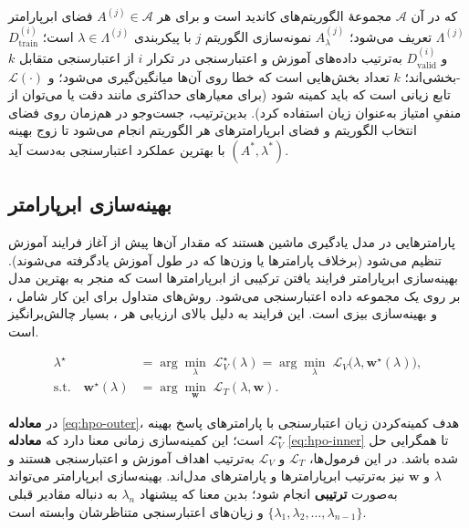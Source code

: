 که در آن \(\mathcal{A}\) مجموعهٔ الگوریتم‌های کاندید است و برای هر \(A^{(j)} \in \mathcal{A}\) فضای ابرپارامتر \(\Lambda^{(j)}\) تعریف می‌شود؛ \(A^{(j)}_{\lambda}\) نمونه‌سازی الگوریتم \(j\) با پیکربندی \(\lambda \in \Lambda^{(j)}\) است؛ \(D^{(i)}_{\mathrm{train}}\) و \(D^{(i)}_{\mathrm{valid}}\) به‌ترتیب داده‌های آموزش و اعتبارسنجی در تکرار \(i\) از اعتبارسنجی متقابل \(k\)-بخشی‌اند؛ \(k\) تعداد بخش‌هایی است که خطا روی آن‌ها میانگین‌گیری می‌شود؛ و \(\mathcal{L}(\cdot)\) تابع زیانی است که باید کمینه شود (برای معیارهای حداکثری مانند دقت یا  می‌توان از منفیِ امتیاز به‌عنوان زیان استفاده کرد). بدین‌ترتیب، جست‌وجو در  هم‌زمان روی فضای انتخاب الگوریتم و فضای ابرپارامترهای هر الگوریتم انجام می‌شود تا زوج بهینه \((A^{*}, \lambda^{*})\) با بهترین عملکرد اعتبارسنجی به‌دست آید.
\subsection{بهینه‌سازی ابرپارامتر}
 پارامترهایی در مدل یادگیری ماشین هستند که مقدار آن‌ها پیش از آغاز فرایند آموزش تنظیم می‌شود (برخلاف پارامترها یا وزن‌ها که در طول آموزش یادگرفته می‌شوند). بهینه‌سازی ابرپارامتر فرایند یافتن ترکیبی از ابرپارامترها است که منجر به بهترین  مدل بر روی یک مجموعه داده اعتبارسنجی می‌شود. روش‌های متداول برای این کار شامل ،  و بهینه‌سازی بیزی است. این فرایند به دلیل  بالای ارزیابی هر ، بسیار چالش‌برانگیز است.

\begin{align}
    \lambda^\star                              & = \arg\min_{\lambda}\; \mathcal{L}_V^\star(\lambda)
    = \arg\min_{\lambda}\; \mathcal{L}_V\!\big(\lambda, \mathbf{w}^\star(\lambda)\big) \label{eq:hpo-outer},                        \\
    \text{s.t.}\quad \mathbf{w}^\star(\lambda) & = \arg\min_{\mathbf{w}}\; \mathcal{L}_T(\lambda, \mathbf{w}) \label{eq:hpo-inner}.
\end{align}

در \textbf{معادله} \eqref{eq:hpo-outer}، هدف کمینه‌کردن زیان اعتبارسنجی با پارامترهای پاسخ بهینه $\mathcal{L}_V^\star$ است؛ این کمینه‌سازی زمانی معنا دارد که \textbf{معادله} \eqref{eq:hpo-inner} تا همگرایی حل شده باشد. در این فرمول‌ها، $\mathcal{L}_T$ و $\mathcal{L}_V$ به‌ترتیب اهداف آموزش و اعتبارسنجی هستند و $\lambda$ و $\mathbf{w}$ نیز به‌ترتیب ابرپارامترها و پارامترهای مدل‌اند. بهینه‌سازی ابرپارامتر می‌تواند به‌صورت \textbf{ترتیبی} انجام شود؛ بدین معنا که پیشنهاد $\lambda_n$ به دنباله مقادیر قبلی $\{\lambda_1,\lambda_2,\ldots,\lambda_{n-1}\}$ و زیان‌های اعتبارسنجی متناظرشان وابسته است.


